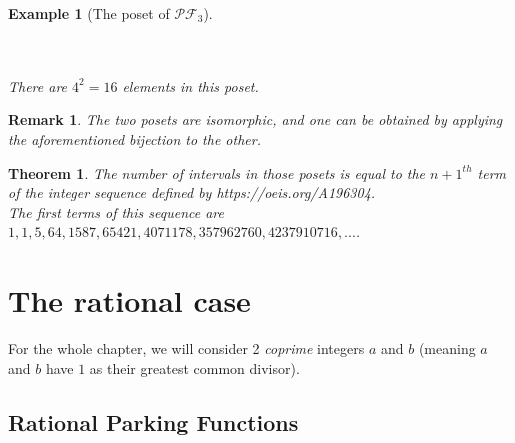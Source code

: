 \documentclass[12pt]{report}
\newtheorem{theorem}{Theorem}
\newtheorem*{example}{Example}
\newtheorem*{rem}{Remark}
\begin{document}
\begin{example}[The poset of $\mathcal{PF}_3$]
\begin{center}
        ~\\
        ~\\
        There are $4^2 = 16$ elements in this poset.
    \end{center}
\end{example}

\begin{rem}
    The two posets are isomorphic, and one can be obtained by
    applying the aforementioned bijection to the other.
\end{rem}

\begin{theorem}
    The number of intervals in those posets is equal to
    the $n+1^{th}$ term of the integer sequence defined by
    https://oeis.org/A196304.\\
    The first terms of this sequence are $1, 1, 5, 64, 1587,
    65421, 4071178, 357962760, 4237910716, ...$.
\end{theorem}

\chapter{The rational case}

For the whole chapter, we will consider 2 \emph{coprime}
integers $a$ and $b$ (meaning $a$ and $b$ have $1$ as their
greatest common divisor).

\section{Rational Parking Functions}
\end{document}

